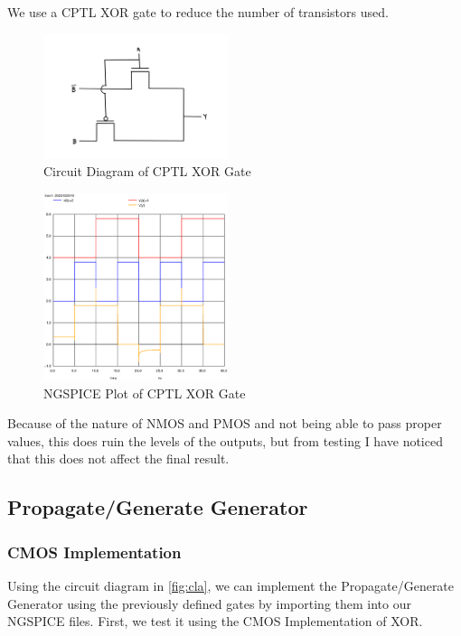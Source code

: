 \documentclass[conference]{IEEEtran}
\begin{document}
We use a CPTL XOR gate to reduce the number of transistors used.

\begin{figure}[H]
    \centering
    \includegraphics[width=0.48\textwidth]{images/xor_optimized_circuit_diagram.png}
    \caption{Circuit Diagram of CPTL XOR Gate}
\end{figure}

\begin{figure}[H]
    \centering
    \includegraphics[width=0.48\textwidth]{images/xor_optimized_tran.eps}
    \caption{NGSPICE Plot of CPTL XOR Gate}
\end{figure}

Because of the nature of NMOS and PMOS and not being able to pass proper values, this does ruin the levels of the outputs, but from testing I have noticed that this does not affect the final result.

\subsection{Propagate/Generate Generator}

\subsubsection{CMOS Implementation}

Using the circuit diagram in \ref{fig:cla}, we can implement the Propagate/Generate Generator using the previously defined gates by importing them into our NGSPICE files. First, we test it using the CMOS Implementation of XOR.
\end{document}
